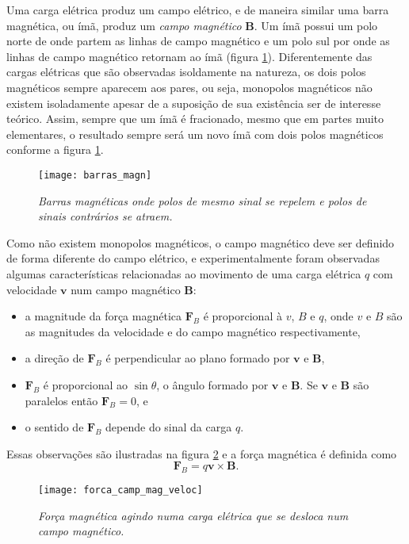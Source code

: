 Uma carga elétrica produz um campo elétrico, e de maneira similar uma barra magnética, ou ímã, produz um \textit{campo magnético} $\textbf{B}$. Um ímã possui um polo norte de onde partem as linhas de campo magnético e um polo sul por onde as linhas de campo magnético retornam ao ímã (figura \ref{fig.barras_mag}). Diferentemente das cargas elétricas que são observadas isoldamente na natureza, os dois polos magnéticos sempre aparecem aos pares, ou seja, monopolos magnéticos não existem isoladamente apesar de a suposição de sua existência ser de interesse teórico. Assim, sempre que um ímã é fracionado, mesmo que em partes muito elementares, o resultado sempre será um novo ímã com dois polos magnéticos conforme a figura \ref{fig.barras_mag}.
\begin{figure}[!htb]
\centering
\texttt{[image: barras\_magn]}
\caption{\textit{Barras magnéticas onde polos de mesmo sinal se repelem e polos de sinais contrários se atraem.}}
\label{fig.barras_mag}
\end{figure}
Como não existem monopolos magnéticos, o campo magnético deve ser definido de forma diferente do campo elétrico, e experimentalmente foram observadas algumas características relacionadas ao movimento de uma carga elétrica $q$ com velocidade $\textbf{v}$ num campo magnético $\textbf{B}$:
\begin{itemize}
\item a magnitude da força magnética $\textbf{F}_B$ é proporcional à $v$, $B$ e $q$, onde $v$ e $B$ são as magnitudes da velocidade e do campo magnético respectivamente,
\item a direção de $\textbf{F}_B$ é perpendicular ao plano formado por $\textbf{v}$ e $\textbf{B}$,
\item $\textbf{F}_B$ é proporcional ao $\sin\theta$, o ângulo formado por $\textbf{v}$ e $\textbf{B}$. Se $\textbf{v}$ e $\textbf{B}$ são paralelos então $\textbf{F}_B=0$, e
\item o sentido de $\textbf{F}_B$ depende do sinal da carga $q$.
\end{itemize}
Essas observações são ilustradas na figura \ref{fig.froca_mag_veloc} e a força magnética é definida como
\begin{equation*}
\textbf{F}_B=q\textbf{v}\times\textbf{B}.
\end{equation*}
\begin{figure}[!htb]
\centering
\texttt{[image: forca\_camp\_mag\_veloc]}
\caption{\textit{Força magnética agindo numa carga elétrica que se desloca num campo magnético.}}
\label{fig.froca_mag_veloc}
\end{figure}
